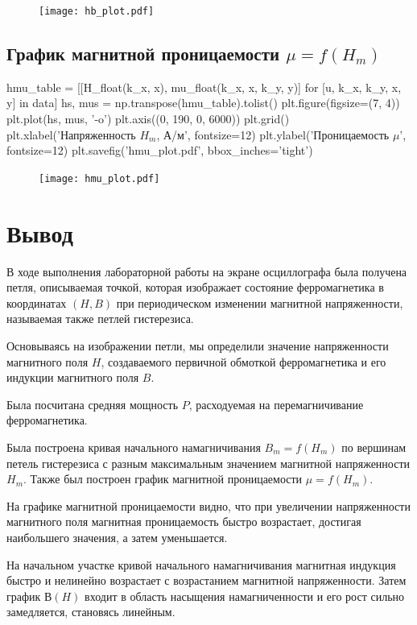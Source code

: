 \documentclass[12pt, a4paper]{article}
\begin{document}
\begin{figure}[H]
\texttt{[image: hb\_plot.pdf]}
\end{figure}

\subsection*{График магнитной проницаемости $\mu = f(H_m)$}

\begin{pycode}
hmu_table = [[H_float(k_x, x), mu_float(k_x, x, k_y, y)]
  for [u, k_x, k_y, x, y] in data]
hs, mus = np.transpose(hmu_table).tolist()
plt.figure(figsize=(7, 4))
plt.plot(hs, mus, '-o')
plt.axis((0, 190, 0, 6000))
plt.grid()
plt.xlabel('Напряженность $H_m$, А/м', fontsize=12)
plt.ylabel('Проницаемость $\mu$', fontsize=12)
plt.savefig('hmu_plot.pdf', bbox_inches='tight')
\end{pycode}

\begin{figure}[H]
\texttt{[image: hmu\_plot.pdf]}
\end{figure}

\section*{Вывод}

В ходе выполнения лабораторной работы на экране осциллографа была получена петля,
описываемая точкой, которая изображает состояние ферромагнетика в координатах $(H, B)$
при периодическом изменении магнитной напряженности, называемая также петлей гистерезиса.

Основываясь на изображении петли, мы определили значение напряженности магнитного поля $H$,
создаваемого первичной обмоткой ферромагнетика и его индукции магнитного поля $B$.

Была посчитана средняя мощность $P$, расходуемая на перемагничивание ферромагнетика.

Была построена кривая начального намагничивания $B_m = f(H_m)$ по вершинам петель гистерезиса
с разным максимальным значением магнитной напряженности $H_m$. Также был построен график
магнитной проницаемости $\mu = f(H_m)$.

На графике магнитной проницаемости видно, что при увеличении напряженности магнитного поля
магнитная проницаемость быстро возрастает, достигая наибольшего значения, а затем уменьшается.

На начальном участке кривой начального намагничивания магнитная индукция быстро и нелинейно
возрастает с возрастанием магнитной напряженности. Затем график $В(H)$ входит в область
насыщения намагниченности и его рост сильно замедляется, становясь линейным. 
\end{document}
